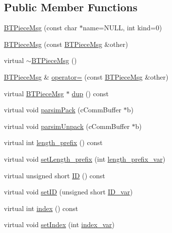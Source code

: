 \subsection*{Public Member Functions}
\begin{DoxyCompactItemize}
\item 
\hyperlink{classBTPieceMsg_aab94a7d9cecf74bbcb4d33c73621e79d}{B\+T\+Piece\+Msg} (const char $\ast$name=N\+U\+L\+L, int kind=0)
\item 
\hyperlink{classBTPieceMsg_ab48d04a29681a8811a4c6d89da094694}{B\+T\+Piece\+Msg} (const \hyperlink{classBTPieceMsg}{B\+T\+Piece\+Msg} \&other)
\item 
virtual \hyperlink{classBTPieceMsg_afd8e46d483a4b668ba2ddbb9ca590026}{$\sim$\+B\+T\+Piece\+Msg} ()
\item 
\hyperlink{classBTPieceMsg}{B\+T\+Piece\+Msg} \& \hyperlink{classBTPieceMsg_ac1bfbf0821b74bff9ba498d184e284f8}{operator=} (const \hyperlink{classBTPieceMsg}{B\+T\+Piece\+Msg} \&other)
\item 
virtual \hyperlink{classBTPieceMsg}{B\+T\+Piece\+Msg} $\ast$ \hyperlink{classBTPieceMsg_a8a9595f0d774d5ca06c7639429a93466}{dup} () const 
\item 
virtual void \hyperlink{classBTPieceMsg_a4c624dd2267836deb6779537738c492d}{parsim\+Pack} (c\+Comm\+Buffer $\ast$b)
\item 
virtual void \hyperlink{classBTPieceMsg_a8d1a9a3ac51eab276e6126dd4efece0a}{parsim\+Unpack} (c\+Comm\+Buffer $\ast$b)
\item 
virtual int \hyperlink{classBTPieceMsg_a18301230ce36b59e267b85187f44bafb}{length\+\_\+prefix} () const 
\item 
virtual void \hyperlink{classBTPieceMsg_a8b2686847a190f607d47a468a987ee39}{set\+Length\+\_\+prefix} (int \hyperlink{classBTPieceMsg_a003b938dabb53ea470ef14fee77ce17c}{length\+\_\+prefix\+\_\+var})
\item 
virtual unsigned short \hyperlink{classBTPieceMsg_a735d57e9641da83acaef1ae2d07b8a68}{I\+D} () const 
\item 
virtual void \hyperlink{classBTPieceMsg_a11ae1569ddf762680aea8080bc5ff3a8}{set\+I\+D} (unsigned short \hyperlink{classBTPieceMsg_aa46d6993c9d02a3b4add2a69b811de48}{I\+D\+\_\+var})
\item 
virtual int \hyperlink{classBTPieceMsg_ad88358d275933f9df950b6ce5d2b13f8}{index} () const 
\item 
virtual void \hyperlink{classBTPieceMsg_aabb09154f661b4f224b683be6d97148a}{set\+Index} (int \hyperlink{classBTPieceMsg_a5caacefaece64a71bc6b5e209e4d13a0}{index\+\_\+var})

\end{DoxyCompactItemize}
